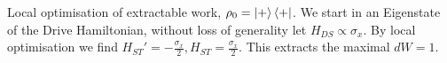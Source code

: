 \documentclass{article}
\begin{document}
%	
Local optimisation of extractable work, $\rho_0 = \ket{+}\bra{+}$.
We start in an Eigenstate of the Drive Hamiltonian, without loss of generality let $H_{DS} \propto \sigma_x$.
By local optimisation we find $H_{ST}' = -\frac{\sigma_x}{2}, H_{ST} = \frac{\sigma_x}{2}$.
This extracts the maximal $dW = 1$.
\end{document}
